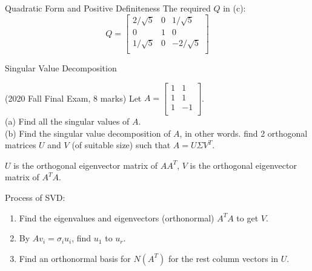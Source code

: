 \documentclass{beamer}
\begin{document}
\begin{frame}{Quadratic Form and Positive Definiteness}
The required $Q$ in (c):
\begin{equation*}
    Q=\left[ \begin{matrix}
        2/\sqrt{5}&		0&		1/\sqrt{5}\\
        0&		1&		0\\
        1/\sqrt{5}&		0&		-2/\sqrt{5}\\
    \end{matrix} \right]
\end{equation*}
\end{frame}

\begin{frame}{Singular Value Decomposition}
\begin{example}
    (2020 Fall Final Exam, 8 marks) Let $A=\left[ \begin{matrix}
        1&		1\\
        1&		1\\
        1&		-1\\
    \end{matrix} \right]$.\\
    (a) Find all the singular values of $A$.\\
    (b) Find the singular value decomposition of $A$, in other words. find 2 orthogonal matrices $U$ and $V$ (of suitable size) such that $A=U\varSigma V^T$.
\end{example}

$U$ is the orthogonal eigenvector matrix of $AA^T$, $V$ is the orthogonal eigenvector matrix of $A^TA$.

\vspace{3pt}
Process of SVD:
\begin{enumerate}
    \item Find the eigenvalues and eigenvectors (orthonormal) $A^TA$ to get $V$.
    \item By $Av_i=\sigma_iu_i$, find $u_1$ to $u_r$.
    \item Find an orthonormal basis for $N(A^T)$ for the rest column vectors in $U$.
\end{enumerate}
\end{frame}
\end{document}
